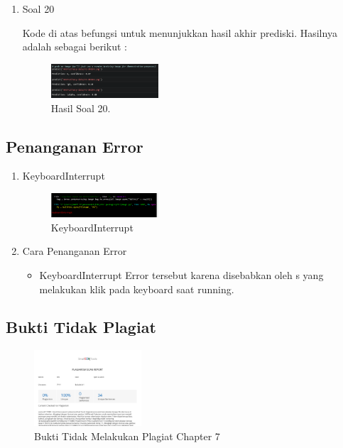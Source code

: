 \begin{enumerate}
	\item Soal 20
	\hfill\break
	
	Kode di atas befungsi untuk menunjukkan hasil akhir prediski. Hasilnya adalah sebagai berikut :  
	\begin{figure}[H]
	\centering
		\includegraphics[width=4cm]{figures/1174070/7/materi/hasil20.PNG}
		\caption{Hasil Soal 20.}
	\end{figure}
\end{enumerate}

\subsection{Penanganan Error}
\begin{enumerate}
	\item KeyboardInterrupt
	\begin{figure}[H]
		\includegraphics[width=4cm]{figures/1174070/7/error/1.PNG}
		\centering
		\caption{KeyboardInterrupt}
	\end{figure}

	\item Cara Penanganan Error
	\begin{itemize}
		\item KeyboardInterrupt
		\hfill\break
		Error tersebut karena disebabkan oleh s yang melakukan klik pada keyboard saat running.
	\end{itemize}
\end{enumerate}

\subsection{Bukti Tidak Plagiat}
\begin{figure}[H]
\centering
	\includegraphics[width=4cm]{figures/1174070/7/buktiplagiat/1.PNG}
	\caption{Bukti Tidak Melakukan Plagiat Chapter 7}
\end{figure}


